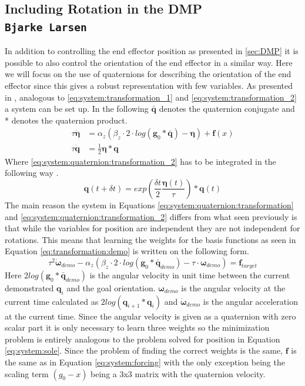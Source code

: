 \documentclass[../main.tex]{subfiles}
\begin{document}
\subsection{Including Rotation in the DMP \\ \normalfont\normalsize\texttt{Bjarke Larsen}} \label{subsec:dmp_with_rotation}
In addition to controlling the end effector position as presented in \autoref{sec:DMP} it is possible to also control the orientation of the end effector in a similar way. Here we will focus on the use of quaternions for describing the orientation of the end effector since this gives a robust representation with few variables. As presented in \cite{ude_orientation_2014}, analogous to \autoref{eq:system:transformation_1} and \ref{eq:system:transformation_2} a system can be set up. In the following $\mathbf{\bar{q}}$ denotes the quaternion conjugate and * denotes the quaternion product.
\begin{align}\label{eq:system:quaternion:transformation}
    \tau\dot{\boldsymbol{\eta}} &= \alpha_z(\beta_z\cdot2\cdot log(\mathbf{g}_0*\mathbf{\bar{q}})-\boldsymbol{\eta})+\mathbf{f}(x)\\
    \tau\dot{\mathbf{q}} &= \frac{1}{2}\boldsymbol{\eta}*\mathbf{q}\label{eq:system:quaternion:transformation_2}
\end{align}
Where \autoref{eq:system:quaternion:transformation_2} has to be integrated in the following way \cite{ude_orientation_2014}.
\begin{equation}
    \mathbf{q}(t+\delta t)=exp\left(\frac{\delta t}{2}\frac{\boldsymbol{\eta}(t)}{\tau}\right) * \mathbf{q}(t)
\end{equation}
The main reason the system in Equations \ref{eq:system:quaternion:transformation} and \ref{eq:system:quaternion:transformation_2} differs from what seen previously is that while the variables for position are independent they are not independent for rotations.
This means that learning the weights for the basis functions as seen in Equation \ref{eq:transformation:demo} is written on the following form.
\begin{equation}
    \tau^2\dot{\boldsymbol{\omega}}_{demo}-\alpha_z(\beta_z\cdot2\cdot log(\mathbf{g}_0*\bar{\mathbf{q}}_{demo})-\tau\cdot{\boldsymbol{\omega}}_{demo}) = \mathbf{f}_{target}
\end{equation}
Here $2log(\mathbf{g}_0*\mathbf{\bar{q}}_{demo})$ is the angular velocity in unit time between the current demonstrated $\mathbf{q}_i$ and the goal orientation. $\boldsymbol{\omega}_{demo}$ is the angular velocity at the current time calculated as $2log(\mathbf{q}_{i+1}*\mathbf{q}_i)$ and $\boldsymbol{\dot{\omega}}_{demo}$ is the angular acceleration at the current time. Since the angular velocity is given as a quaternion with zero scalar part it is only necessary to learn three weights so the minimization problem is entirely analogous to the problem solved for position in Equation \ref{eq:system:sole}. Since the problem of finding the correct weights is the same, $\mathbf{f}$ is the same as in Equation \ref{eq:system:forcing} with the only exception being the scaling term $(g_0-x)$ being a 3x3 matrix with the quaternion velocity.\\
\end{document}
